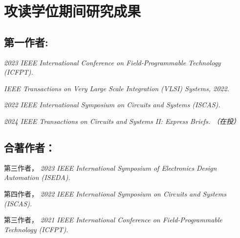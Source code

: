 \chapter{攻读学位期间研究成果}

\ifdefined\PubBlind
\section*{第一作者:}
\begin{enumerate}[label={[\arabic*]}]
  \item \textit{2023 IEEE International Conference on Field-Programmable Technology (ICFPT).}
  \item \textit{IEEE Transactions on Very Large Scale Integration (VLSI) Systems, 2022.}
  \item \textit{2022 IEEE International Symposium on Circuits and Systems (ISCAS).}
  \item \textit{2024 IEEE Transactions on Circuits and Systems II: Express Briefs. （在投）}
\end{enumerate}

\vspace{5pt}
\section*{合著作者：}
\begin{enumerate}[label={[\arabic*]}]
  \item 第三作者， \textit{2023 IEEE  International Symposium of Electronics Design Automation (ISEDA).}
  \item 第四作者， \textit{2022 IEEE International Symposium on Circuits and Systems (ISCAS).}
  \item 第三作者， \textit{2021 IEEE International Conference on Field-Programmable Technology (ICFPT).}
\end{enumerate}

\else


